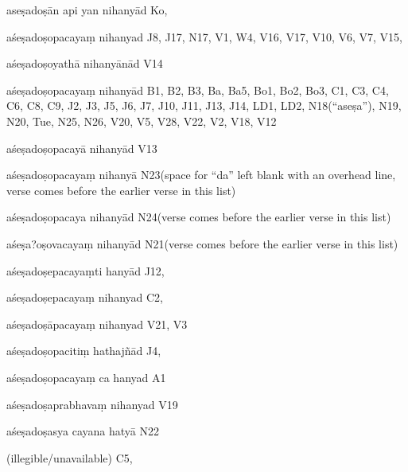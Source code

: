 \begin{ekdosis}
\begin{marma}[hp01_055]
\begin{marma}[hp02_009]
\begin{marma}[hp02_011]
      \begin{marma}[hp02_29c]
      \item[aseṣadoṣān api yan nihanyād] Ko, 
      \item[aśeṣadoṣopacayaṃ nihanyad] J8, J17, N17, V1, W4, V16, V17, V10, V6, V7, V15, 
      \item[aśeṣadoṣoyathā nihanyānād] V14
      \item[aśeṣadoṣopacayaṃ nihanyād] B1, B2, B3, Ba, Ba5, Bo1, Bo2, Bo3, C1, C3, C4, C6, C8, C9, J2, J3, J5, J6, J7, J10, J11, J13, J14, LD1, LD2, N18(“aseṣa”), N19, N20, Tue, N25, N26, V20, V5, V28, V22, V2, V18, V12
      \item[aśeṣadoṣopacayā nihanyād] V13
      \item[aśeṣadoṣopacayaṃ nihanyā] N23(space for “da” left blank with an overhead line, verse comes before the earlier verse in this list)
      \item[aśeṣadoṣopacaya nihanyād] N24(verse comes before the earlier verse in this list)
      \item[aśeṣa?oṣovacayaṃ nihanyād] N21(verse comes before the earlier verse in this list)
      \item[aśeṣadoṣepacayaṃti hanyād] J12,
      \item[aśeṣadoṣepacayaṃ nihanyad] C2,
      \item[aśeṣadoṣāpacayaṃ nihanyad] V21, V3
      \item[aśeṣadoṣopacitiṃ hathajñād] J4,
      \item[aśeṣadoṣopacayaṃ ca hanyad] A1
      \item[aśeṣadoṣaprabhavaṃ nihanyad] V19
      \item[aśeṣadoṣasya cayana hatyā] N22
      \item[(illegible/unavailable)] C5,
        \begin{description}

        \end{description}
      \end{marma}


\end{marma}
\end{marma}
\end{marma}
\end{ekdosis}
